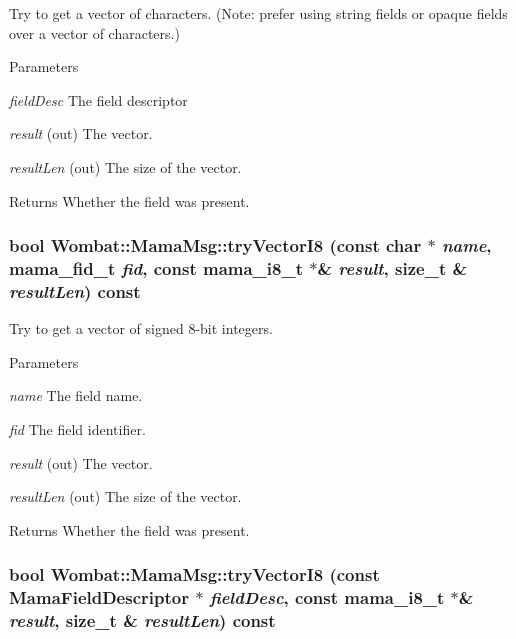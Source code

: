Try to get a vector of characters. (Note: prefer using string fields or opaque fields over a vector of characters.) 
\begin{DoxyParams}{Parameters}
\item[{\em fieldDesc}]The field descriptor \item[{\em result}](out) The vector. \item[{\em resultLen}](out) The size of the vector. \end{DoxyParams}
\begin{DoxyReturn}{Returns}
Whether the field was present. 
\end{DoxyReturn}
\hypertarget{classWombat_1_1MamaMsg_ae1402419192820e577586ec9a30b9d79}{
\subsubsection[{tryVectorI8}]{\setlength{\rightskip}{0pt plus 5cm}bool Wombat::MamaMsg::tryVectorI8 (const char $\ast$ {\em name}, \/  mama\_\-fid\_\-t {\em fid}, \/  const mama\_\-i8\_\-t $\ast$\& {\em result}, \/  size\_\-t \& {\em resultLen}) const}}
\label{classWombat_1_1MamaMsg_ae1402419192820e577586ec9a30b9d79}


Try to get a vector of signed 8-\/bit integers. 
\begin{DoxyParams}{Parameters}
\item[{\em name}]The field name. \item[{\em fid}]The field identifier. \item[{\em result}](out) The vector. \item[{\em resultLen}](out) The size of the vector. \end{DoxyParams}
\begin{DoxyReturn}{Returns}
Whether the field was present. 
\end{DoxyReturn}
\hypertarget{classWombat_1_1MamaMsg_a71da30e829c5c9cee93a10b7e3aa2816}{
\subsubsection[{tryVectorI8}]{\setlength{\rightskip}{0pt plus 5cm}bool Wombat::MamaMsg::tryVectorI8 (const {\bf MamaFieldDescriptor} $\ast$ {\em fieldDesc}, \/  const mama\_\-i8\_\-t $\ast$\& {\em result}, \/  size\_\-t \& {\em resultLen}) const}}
\label{classWombat_1_1MamaMsg_a71da30e829c5c9cee93a10b7e3aa2816}



